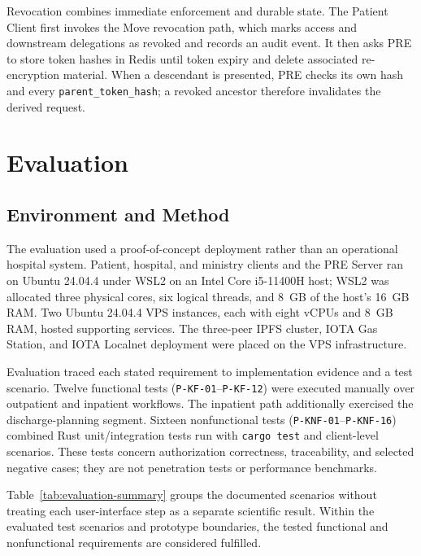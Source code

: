 \documentclass[conference,a4paper,english]{IEEEtran}
\begin{document}
Revocation combines immediate enforcement and durable state. The Patient Client first invokes the Move revocation path, which marks access and downstream delegations as revoked and records an audit event. It then asks PRE to store token hashes in Redis until token expiry and delete associated re-encryption material. When a descendant is presented, PRE checks its own hash and every \texttt{parent\_token\_hash}; a revoked ancestor therefore invalidates the derived request.

\section{Evaluation}
\label{sec:evaluation}

\subsection{Environment and Method}

The evaluation used a proof-of-concept deployment rather than an operational hospital system. Patient, hospital, and ministry clients and the PRE Server ran on Ubuntu 24.04.4 under WSL2 on an Intel Core i5-11400H host; WSL2 was allocated three physical cores, six logical threads, and 8~GB of the host's 16~GB RAM. Two Ubuntu 24.04.4 VPS instances, each with eight vCPUs and 8~GB RAM, hosted supporting services. The three-peer IPFS cluster, IOTA Gas Station, and IOTA Localnet deployment were placed on the VPS infrastructure.

Evaluation traced each stated requirement to implementation evidence and a test scenario. Twelve functional tests (\texttt{P-KF-01}--\texttt{P-KF-12}) were executed manually over outpatient and inpatient workflows. The inpatient path additionally exercised the discharge-planning segment. Sixteen nonfunctional tests (\texttt{P-KNF-01}--\texttt{P-KNF-16}) combined Rust unit/integration tests run with \texttt{cargo test} and client-level scenarios. These tests concern authorization correctness, traceability, and selected negative cases; they are not penetration tests or performance benchmarks.

Table~\ref{tab:evaluation-summary} groups the documented scenarios without treating each user-interface step as a separate scientific result. Within the evaluated test scenarios and prototype boundaries, the tested functional and nonfunctional requirements are considered fulfilled.
\end{document}
